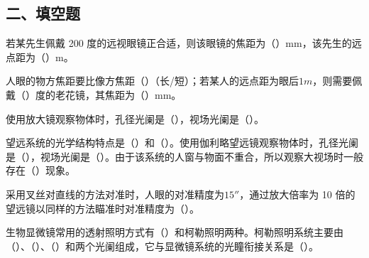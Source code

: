 \documentclass[standard, analysis, notocnum]{ExBook}
\newcommand{\answerarea}[1][8cm]{%
  \par\vspace{2mm}%
  \noindent{\color{themeColor!35}\rule{\linewidth}{0.4pt}}\par
  \noindent\begin{minipage}[t][#1][t]{\linewidth}\vspace{0pt}\end{minipage}\par
  \noindent{\color{themeColor!35}\rule{\linewidth}{0.4pt}}\par
}
\begin{document}
\subsection{二、填空题}
\begin{qitems}
\begin{bbox}
\qitem 若某先生佩戴 200 度的远视眼镜正合适，则该眼镜的焦距为（\hspace{1.6em}）mm，该先生的远点距为（\hspace{1.6em}）m。
\answerarea[3.5cm]
\end{bbox}
\begin{bbox}
\qitem 人眼的物方焦距要比像方焦距（\hspace{1.6em}）（长/短）；若某人的远点距为眼后$1m$，则需要佩戴（\hspace{1.6em}）度的老花镜，其焦距为（\hspace{1.6em}）mm。
\answerarea[3.5cm]
\end{bbox}
\begin{bbox}
\qitem 使用放大镜观察物体时，孔径光阑是（\hspace{1.6em}），视场光阑是（\hspace{1.6em}）。
\answerarea[3.5cm]
\end{bbox}
\begin{bbox}
\qitem 望远系统的光学结构特点是（\hspace{1.6em}）和（\hspace{1.6em}）。使用伽利略望远镜观察物体时，孔径光阑是（\hspace{1.6em}），视场光阑是（\hspace{1.6em}）。由于该系统的人窗与物面不重合，所以观察大视场时一般存在（\hspace{1.6em}）现象。
\answerarea[3.5cm]
\end{bbox}
\begin{bbox}
\qitem 采用叉丝对直线的方法对准时，人眼的对准精度为$15''$，通过放大倍率为 10 倍的望远镜以同样的方法瞄准时对准精度为（\hspace{1.6em}）。
\answerarea[3.5cm]
\end{bbox}
\begin{bbox}
\qitem 生物显微镜常用的透射照明方式有（\hspace{1.6em}）和柯勒照明两种。柯勒照明系统主要由（\hspace{1.6em}）、（\hspace{1.6em}）、（\hspace{1.6em}）和两个光阑组成，它与显微镜系统的光瞳衔接关系是（\hspace{1.6em}）。
\answerarea[3.5cm]

\end{bbox}
\end{qitems}
\end{document}
